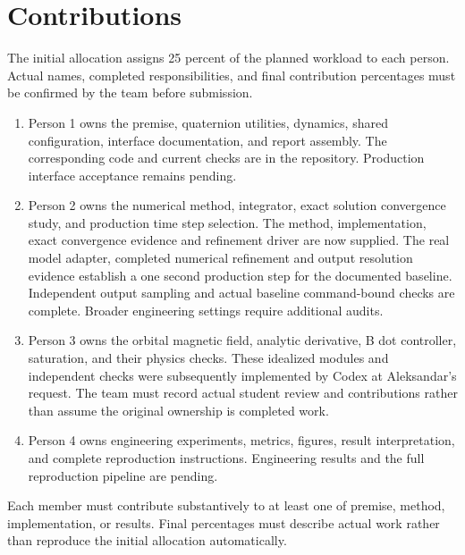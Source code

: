 \section{Contributions}
The initial allocation assigns 25 percent of the planned workload to each person. Actual names, completed responsibilities, and final contribution percentages must be confirmed by the team before submission.
\begin{enumerate}
\item Person 1 owns the premise, quaternion utilities, dynamics, shared configuration, interface documentation, and report assembly. The corresponding code and current checks are in the repository. Production interface acceptance remains pending.
\item Person 2 owns the numerical method, integrator, exact solution convergence study, and production time step selection. The method, implementation, exact convergence evidence and refinement driver are now supplied. The real model adapter, completed numerical refinement and output resolution evidence establish a one second production step for the documented baseline. Independent output sampling and actual baseline command-bound checks are complete. Broader engineering settings require additional audits.
\item Person 3 owns the orbital magnetic field, analytic derivative, B dot controller, saturation, and their physics checks. These idealized modules and independent checks were subsequently implemented by Codex at Aleksandar's request. The team must record actual student review and contributions rather than assume the original ownership is completed work.
\item Person 4 owns engineering experiments, metrics, figures, result interpretation, and complete reproduction instructions. Engineering results and the full reproduction pipeline are pending.
\end{enumerate}
Each member must contribute substantively to at least one of premise, method, implementation, or results. Final percentages must describe actual work rather than reproduce the initial allocation automatically.
